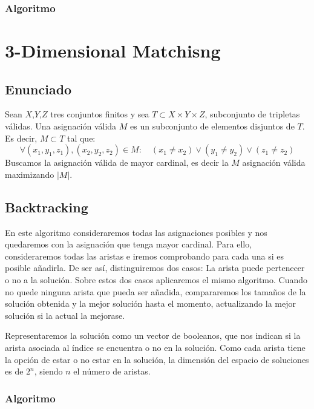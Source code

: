 \documentclass[a4paper, 11pt]{article} %
\begin{document}
      \subsubsection{Algoritmo}
      
    \section{3-Dimensional Matchisng}
    \subsection{Enunciado}
    Sean $X$,$Y$,$Z$ tres conjuntos finitos y sea $T \subset X \times Y \times Z$, subconjunto de tripletas válidas.
    Una asignación válida $M$ es un subconjunto de elementos disjuntos de $T$. Es decir, $M \subset T$ tal que:
    \begin{equation}
        \forall (x_1,y_1,z_1), (x_2,y_2,z_2) \in M : \quad (x_1 \neq x_2) \vee (y_1 \neq y_2) \vee (z_1 \neq z_2)
        \end{equation} 
        Buscamos la asignación válida de mayor cardinal, es decir la $M$ asignación válida maximizando $|M|$.
        
        \subsection{Backtracking}
	  En este algoritmo consideraremos todas las asignaciones posibles y nos quedaremos con la asignación que tenga mayor cardinal. 
	  Para ello, consideraremos todas las aristas e iremos comprobando para cada una si es posible añadirla. De ser así, distinguiremos 
	  dos casos: La arista puede pertenecer o no a la solución. Sobre estos dos casos aplicaremos el mismo algoritmo. Cuando no quede
	  ninguna arista que pueda ser añadida, compararemos los tamaños de la solución obtenida y la mejor solución hasta el momento, 
	  actualizando la mejor solución si la actual la mejorase. 
	  
	  Representaremos la solución como un vector de booleanos, que nos indican si la arista asociada al índice se encuentra o 
	  no en la solución. Como cada arista tiene la opción de estar o no estar en la solución, la dimensión del espacio de 
	  soluciones es de $2^n$, siendo $n$ el número de aristas.
	    
	  \subsubsection{Algoritmo}
	    \small
	    \texttt{}
	    \normalsize
	  
\end{document}
